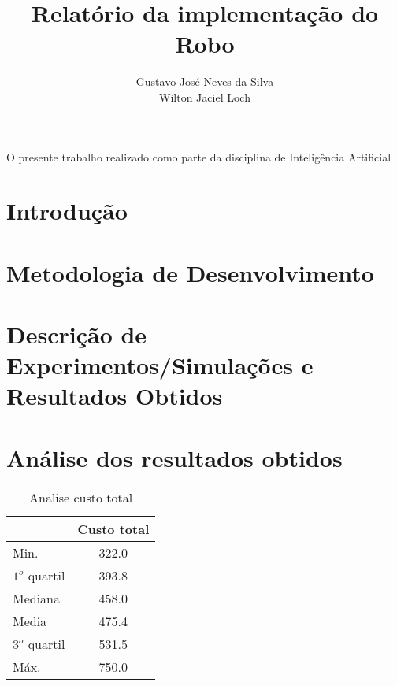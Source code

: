 \documentclass[12pt]{article}
\title{Relatório da implementação do Robo}
\author{Gustavo José Neves da Silva\inst{1}\\Wilton Jaciel Loch\inst{1}}
\begin{document}
 

\maketitle

     
\begin{resumo}
O presente trabalho realizado como parte da disciplina de Inteligência Artificial
\end{resumo}

\section{Introdução} \label{sec:Introducao}

\section{Metodologia de Desenvolvimento} \label{sec:Desenvolv}
	
\section{Descrição de Experimentos/Simulações e Resultados Obtidos} \label{sec:DescExp}

\section{Análise dos resultados obtidos} \label{sec:Results}
\begin{table}[h]
	\centering
	\begin{tabular}{|l|c|}
	\hline
	& Custo total \\ \hline
	Min. & 322.0 \\ \hline
	$1^{o}$ quartil & 393.8 \\ \hline
	Mediana & 458.0 \\ \hline
	Media & 475.4 \\ \hline
	$3^{o}$ quartil & 531.5 \\ \hline
	Máx. & 750.0 \\ \hline
	\end{tabular}
	\caption{Analise custo total}
	\label{tabela:custo}
\end{table}
\end{document}
